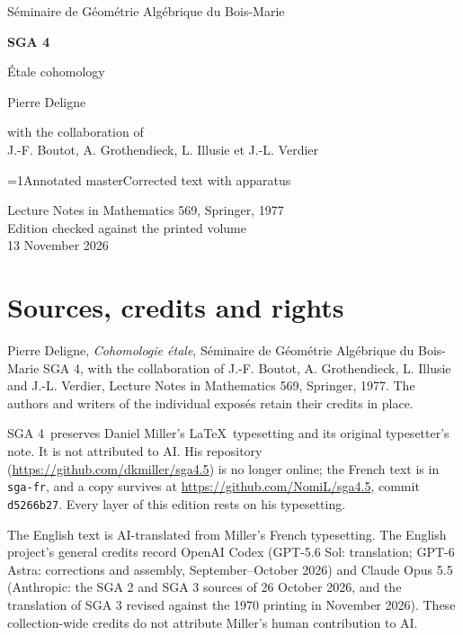 \documentclass[oneside]{book}
\theoremstyle{sga-source}
\theoremstyle{sga-source-dash}
\theoremstyle{sga-source-dotdash}
\theoremstyle{sga-source-number-note-dash}
\theoremstyle{sga-source-note-number-dotdash}
\theoremstyle{sga-source-example-dotdash}
\theoremstyle{sga-source-inline-number}
\theoremstyle{sga-source-bare-number}
\theoremstyle{sga-source}
\providecommand\EditionIsMaster{0}
\begin{document}
\begin{titlepage}
\centering
\vspace*{2cm}
{\Large Séminaire de Géométrie Algébrique du Bois-Marie\par}
\vspace{0.7cm}
{\Huge\bfseries SGA 4\textonehalf\par}
\vspace{0.8cm}
{\huge Étale cohomology\par}
\vspace{1cm}
{\Large Pierre Deligne\par}
\vspace{0.5cm}
with the collaboration of\\[0.3em]
J.-F. Boutot, A. Grothendieck, L. Illusie et J.-L. Verdier
\vfill
{\Large \ifnum\EditionIsMaster=1\relax Annotated master\else Corrected text with apparatus\fi\par}
\vspace{0.7cm}
Lecture Notes in Mathematics 569, Springer, 1977\\[0.4em]
Edition checked against the printed volume\\
13 November 2026
\end{titlepage}

\chapter*{Sources, credits and rights}
Pierre Deligne, \emph{Cohomologie étale}, Séminaire de Géométrie Algébrique
du Bois-Marie SGA 4\textonehalf, with the collaboration of J.-F. Boutot,
A. Grothendieck, L. Illusie and J.-L. Verdier, Lecture Notes in Mathematics
569, Springer, 1977. The authors and writers of the individual exposés
retain their credits in place.

\medskip
SGA 4\textonehalf\ preserves Daniel Miller’s \LaTeX\ typesetting and its
original typesetter’s note. It is not attributed to AI. His repository
(\url{https://github.com/dkmiller/sga4.5}) is no longer online; the French
text is in \texttt{sga-fr}, and a copy survives at
\url{https://github.com/NomiL/sga4.5}, commit \texttt{d5266b27}.
Every layer of this edition rests on his typesetting.

\medskip
The English text is AI-translated from Miller’s French typesetting.
The English project’s general credits record OpenAI Codex (GPT-5.6 Sol:
translation; GPT-6 Astra: corrections and assembly, September--October
2026) and Claude Opus 5.5 (Anthropic: the SGA 2 and SGA 3 sources of
26 October 2026, and the translation of SGA 3 revised against the 1970
printing in November 2026). These collection-wide credits do not attribute
Miller’s human contribution to AI.
\end{document}
